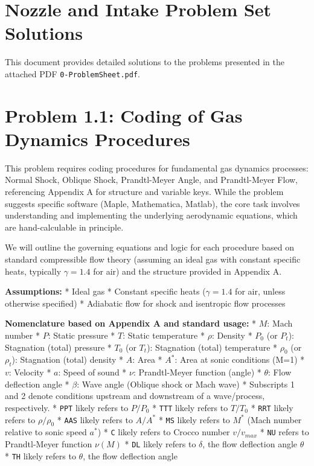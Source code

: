 \hypertarget{nozzle-and-intake-problem-set-solutions}{%
\section{Nozzle and Intake Problem Set
Solutions}\label{nozzle-and-intake-problem-set-solutions}}

This document provides detailed solutions to the problems presented in
the attached PDF \texttt{0-ProblemSheet.pdf}.

\hypertarget{problem-1.1-coding-of-gas-dynamics-procedures}{%
\section{Problem 1.1: Coding of Gas Dynamics
Procedures}\label{problem-1.1-coding-of-gas-dynamics-procedures}}

This problem requires coding procedures for fundamental gas dynamics
processes: Normal Shock, Oblique Shock, Prandtl-Meyer Angle, and
Prandtl-Meyer Flow, referencing Appendix A for structure and variable
keys. While the problem suggests specific software (Maple, Mathematica,
Matlab), the core task involves understanding and implementing the
underlying aerodynamic equations, which are hand-calculable in
principle.

We will outline the governing equations and logic for each procedure
based on standard compressible flow theory (assuming an ideal gas with
constant specific heats, typically \(\gamma = 1.4\) for air) and the
structure provided in Appendix A.

\textbf{Assumptions:} * Ideal gas * Constant specific heats
(\(\gamma = 1.4\) for air, unless otherwise specified) * Adiabatic flow
for shock and isentropic flow processes

\textbf{Nomenclature based on Appendix A and standard usage:} * \(M\):
Mach number * \(P\): Static pressure * \(T\): Static temperature *
\(\rho\): Density * \(P_0\) (or \(P_t\)): Stagnation (total) pressure *
\(T_0\) (or \(T_t\)): Stagnation (total) temperature * \(\rho_0\) (or
\(\rho_t\)): Stagnation (total) density * \(A\): Area * \(A^*\): Area at
sonic conditions (M=1) * \(v\): Velocity * \(a\): Speed of sound *
\(\nu\): Prandtl-Meyer function (angle) * \(\theta\): Flow deflection
angle * \(\beta\): Wave angle (Oblique shock or Mach wave) * Subscripts
1 and 2 denote conditions upstream and downstream of a wave/process,
respectively. * \texttt{PPT} likely refers to \(P/P_0\) * \texttt{TTT}
likely refers to \(T/T_0\) * \texttt{RRT} likely refers to
\(\rho/\rho_0\) * \texttt{AAS} likely refers to \(A/A^*\) * \texttt{MS}
likely refers to \(M^*\) (Mach number relative to sonic speed \(a^*\)) *
\texttt{C} likely refers to Crocco number \(v/v_{max}\) * \texttt{NU}
refers to Prandtl-Meyer function \(\nu(M)\) * \texttt{DL} likely refers
to \(\delta\), the flow deflection angle \(\theta\) * \texttt{TH} likely
refers to \(\theta\), the flow deflection angle

